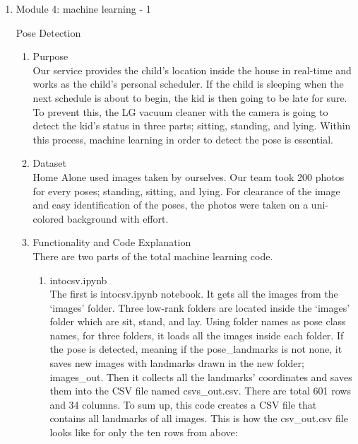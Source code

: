 \documentclass[conference]{IEEEtran}
\begin{document}
\begin{enumerate}[label=\arabic*.]
\begin{enumerate}[label=\arabic*.]
\begin{enumerate}[label=\alph*.]
    \end{enumerate}
    \item {\large{Module 4: machine learning - 1}} \\
    \begin{center}\large{Pose Detection}\\\end{center} 
    \begin{enumerate}[label=\alph*.]
        \item{\large{Purpose}}\\
        Our service provides the child’s location inside the house in real-time and works as the child’s personal scheduler. If the child is sleeping when the next schedule is about to begin, the kid is then going to be late for sure. To prevent this, the LG vacuum cleaner with the camera is going to detect the kid’s status in three parts; sitting, standing, and lying. Within this process, machine learning in order to detect the pose is essential. \\
        \item{\large{Dataset}}\\
        Home Alone used images taken by ourselves. Our team took 200 photos for every poses; standing, sitting, and lying. For clearance of the image and easy identification of the poses, the photos were taken on a uni-colored background with effort. \\
        \item{\large{Functionality and Code Explanation}}\\
        There are two parts of the total machine learning code. \\
        \begin{enumerate}[label=\roman*.]
            \item{\large{intocsv.ipynb}}\\
            The first is intocsv.ipynb notebook. It gets all the images from the ‘images’ folder. Three low-rank folders are located inside the ‘images’ folder which are sit, stand, and lay. Using folder names as pose class names, for three folders, it loads all the images inside each folder. If the pose is detected, meaning if the pose\_landmarks is not none, it saves new images with landmarks drawn in the new folder; images\_out. Then it collects all the landmarks’ coordinates and saves them into the CSV file named csvs\_out.csv. There are total 601 rows and 34 columns. To sum up, this code creates a CSV file that contains all landmarks of all images. This is how the csv\_out.csv file looks like for only the ten rows from above: \\

\end{enumerate}
\end{enumerate}
\end{enumerate}
\end{enumerate}
\end{document}
